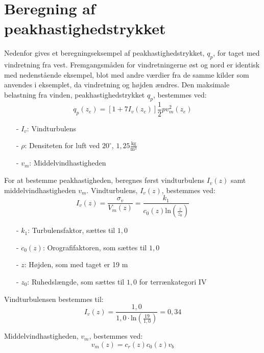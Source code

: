 \chapter{Beregning af peakhastighedstrykket}
Nedenfor gives et beregningseksempel af peakhastighedstrykket, $q_p$, for taget med vindretning fra vest. Fremgangsmåden for vindretningerne øst og nord er identisk med nedenstående eksempel, blot med andre værdier fra de samme kilder som anvendes i eksemplet, da vindretning og højden ændres.
\newline
\newline
Den maksimale belastning fra vinden, peakhastighedstrykket $q_p$, bestemmes ved:
\begin{equation}
	q_p(z_e)=[1+7I_v(z_e)]\frac{1}{2}pv_m^2(z_e)
\end{equation}
\begin{itemize}
	\item[-] $I_v$: Vindturbulens
	\item[-] $\rho$: Densiteten for luft ved $20^{\circ}$, $1,\!25 \frac{\text{kg}}{\text{m}^3}$
	\item[-] $v_m$: Middelvindhastigheden
\end{itemize}
For at bestemme peakhastigheden, beregnes først vindturbulens $I_v(z)$ samt middelvindhastigheden $v_m$.
\newline
\newline
Vindturbulens, $I_v(z)$, bestemmes ved:
\begin{equation}
	I_v(z)=\frac{\sigma_v}{V_m(z)}=\frac{k_1}{c_0(z) \text{ln}(\frac{z}{z_0})}
\end{equation}
\begin{itemize}
	\item[-] $k_1$: Turbulensfaktor, sættes til $1,\!0$ \citep[ kapitel 4.4]{EU91}
	\item[-] $c_0(z)$: Orografifaktoren, som sættes til $1,\!0$ \citep[ kapitel 4.3.1]{EU91}
	\item[-] $z$: Højden, som med taget er 19 m
	\item[-] $z_0$: Ruhedslængde, som sættes til $1,\!0$ for terrænkategori IV \citep[ tabel 4.1 kapitel 4.3.2]{EU91}
\end{itemize}
Vindturbulensen bestemmes til:
\begin{equation}
	I_v(z)=\frac{1,\!0}{1,\!0\cdot \text{ln}(\frac{19}{1,0})}=0,\!34
\end{equation}

Middelvindhastigheden, $v_m$, bestemmes ved:
\begin{equation}
	v_m(z)=c_r(z)c_0(z)v_b
\end{equation}

